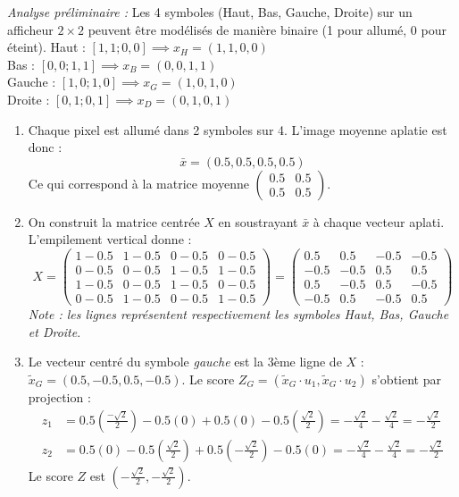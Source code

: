 \documentclass[solutions]{../exercices}
\begin{document}
\begin{solution}
	\noindent \textit{Analyse préliminaire :} Les 4 symboles (Haut, Bas, Gauche, Droite) sur un afficheur $2\times 2$ peuvent être modélisés de manière binaire (1 pour allumé, 0 pour éteint).
	Haut : $[1, 1; 0, 0] \implies x_H = (1, 1, 0, 0)$ \\
	Bas : $[0, 0; 1, 1] \implies x_B = (0, 0, 1, 1)$ \\
	Gauche : $[1, 0; 1, 0] \implies x_G = (1, 0, 1, 0)$ \\
	Droite : $[0, 1; 0, 1] \implies x_D = (0, 1, 0, 1)$

	\begin{enumerate}
		\item Chaque pixel est allumé dans 2 symboles sur 4. L'image moyenne aplatie est donc :
		\[ \bar{x} = (0.5, 0.5, 0.5, 0.5) \]
		Ce qui correspond à la matrice moyenne $\begin{pmatrix} 0.5 & 0.5 \\ 0.5 & 0.5 \end{pmatrix}$.

		\item On construit la matrice centrée $X$ en soustrayant $\bar{x}$ à chaque vecteur aplati. L'empilement vertical donne :
		\[ X = \begin{pmatrix} 
		1 - 0.5 & 1 - 0.5 & 0 - 0.5 & 0 - 0.5 \\
		0 - 0.5 & 0 - 0.5 & 1 - 0.5 & 1 - 0.5 \\
		1 - 0.5 & 0 - 0.5 & 1 - 0.5 & 0 - 0.5 \\
		0 - 0.5 & 1 - 0.5 & 0 - 0.5 & 1 - 0.5
		\end{pmatrix} = \begin{pmatrix} 
		0.5 & 0.5 & -0.5 & -0.5 \\
		-0.5 & -0.5 & 0.5 & 0.5 \\
		0.5 & -0.5 & 0.5 & -0.5 \\
		-0.5 & 0.5 & -0.5 & 0.5
		\end{pmatrix} \]
		\textit{Note : les lignes représentent respectivement les symboles Haut, Bas, Gauche et Droite}.

		\item Le vecteur centré du symbole \textit{gauche} est la 3ème ligne de $X$ : $\tilde{x}_G = (0.5, -0.5, 0.5, -0.5)$.
		Le score $Z_G = (\tilde{x}_G \cdot u_1, \tilde{x}_G \cdot u_2)$ s'obtient par projection :
		\begin{align*}
			z_1 &= 0.5\left(\frac{-\sqrt{2}}{2}\right) - 0.5(0) + 0.5(0) - 0.5\left(\frac{\sqrt{2}}{2}\right) = -\frac{\sqrt{2}}{4} - \frac{\sqrt{2}}{4} = -\frac{\sqrt{2}}{2} \\
			z_2 &= 0.5(0) - 0.5\left(\frac{\sqrt{2}}{2}\right) + 0.5\left(-\frac{\sqrt{2}}{2}\right) - 0.5(0) = -\frac{\sqrt{2}}{4} - \frac{\sqrt{2}}{4} = -\frac{\sqrt{2}}{2}
		\end{align*}
		Le score $Z$ est $\left(-\frac{\sqrt{2}}{2}, -\frac{\sqrt{2}}{2}\right)$.


\end{enumerate}
\end{solution}
\end{document}
